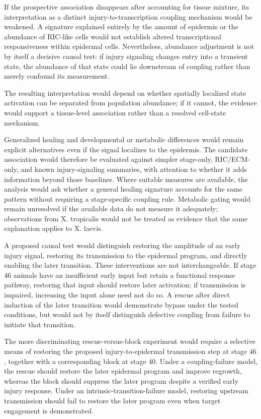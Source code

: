 \documentclass[11pt]{article}
\begin{document}
If the prospective association disappears after accounting for tissue mixture, its interpretation as a distinct injury-to-transcription coupling mechanism would be weakened. A signature explained entirely by the amount of epidermis or the abundance of RIC-like cells would not establish altered transcriptional responsiveness within epidermal cells. Nevertheless, abundance adjustment is not by itself a decisive causal test: if injury signaling changes entry into a transient state, the abundance of that state could lie downstream of coupling rather than merely confound its measurement.

The resulting interpretation would depend on whether spatially localized state activation can be separated from population abundance; if it cannot, the evidence would support a tissue-level association rather than a resolved cell-state mechanism.

Generalized healing and developmental or metabolic differences would remain explicit alternatives even if the signal localizes to the epidermis. The candidate association would therefore be evaluated against simpler stage-only, RIC/ECM-only, and known injury-signaling summaries, with attention to whether it adds information beyond those baselines. Where suitable measures are available, the analysis would ask whether a general healing signature accounts for the same pattern without requiring a stage-specific coupling rule. Metabolic gating would remain unresolved if the available data do not measure it adequately; observations from X. tropicalis would not be treated as evidence that the same explanation applies to X. laevis.

A proposed causal test would distinguish restoring the amplitude of an early injury signal, restoring its transmission to the epidermal program, and directly enabling the later transition. These interventions are not interchangeable. If stage $46$ animals have an insufficient early input but retain a functional response pathway, restoring that input should restore later activation; if transmission is impaired, increasing the input alone need not do so. A rescue after direct induction of the later transition would demonstrate bypass under the tested conditions, but would not by itself distinguish defective coupling from failure to initiate that transition.

The more discriminating rescue-versus-block experiment would require a selective means of restoring the proposed injury-to-epidermal transmission step at stage $46$, together with a corresponding block at stage $40$. Under a coupling-failure model, the rescue should restore the later epidermal program and improve regrowth, whereas the block should suppress the later program despite a verified early injury response. Under an intrinsic-transition-failure model, restoring upstream transmission should fail to restore the later program even when target engagement is demonstrated.
\end{document}
